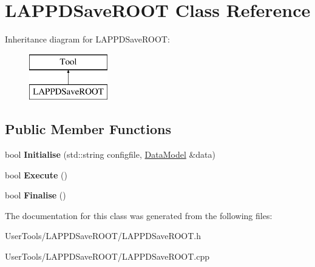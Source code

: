 \hypertarget{classLAPPDSaveROOT}{\section{L\-A\-P\-P\-D\-Save\-R\-O\-O\-T Class Reference}
\label{classLAPPDSaveROOT}
}
Inheritance diagram for L\-A\-P\-P\-D\-Save\-R\-O\-O\-T\-:\begin{figure}[H]
\begin{center}
\leavevmode
\includegraphics[height=2.000000cm]{classLAPPDSaveROOT}
\end{center}
\end{figure}
\subsection*{Public Member Functions}
\begin{DoxyCompactItemize}
\item 
\hypertarget{classLAPPDSaveROOT_aca0e74a9dacc21f8d0b6f19925bb610f}{bool {\bfseries Initialise} (std\-::string configfile, \hyperlink{classDataModel}{Data\-Model} \&data)}\label{classLAPPDSaveROOT_aca0e74a9dacc21f8d0b6f19925bb610f}

\item 
\hypertarget{classLAPPDSaveROOT_ae88cb83e263fc39a17b3a1b376b713d8}{bool {\bfseries Execute} ()}\label{classLAPPDSaveROOT_ae88cb83e263fc39a17b3a1b376b713d8}

\item 
\hypertarget{classLAPPDSaveROOT_a9e91575ae339177f32be29eaefd963af}{bool {\bfseries Finalise} ()}\label{classLAPPDSaveROOT_a9e91575ae339177f32be29eaefd963af}

\end{DoxyCompactItemize}


The documentation for this class was generated from the following files\-:\begin{DoxyCompactItemize}
\item 
User\-Tools/\-L\-A\-P\-P\-D\-Save\-R\-O\-O\-T/L\-A\-P\-P\-D\-Save\-R\-O\-O\-T.\-h\item 
User\-Tools/\-L\-A\-P\-P\-D\-Save\-R\-O\-O\-T/L\-A\-P\-P\-D\-Save\-R\-O\-O\-T.\-cpp\end{DoxyCompactItemize}
